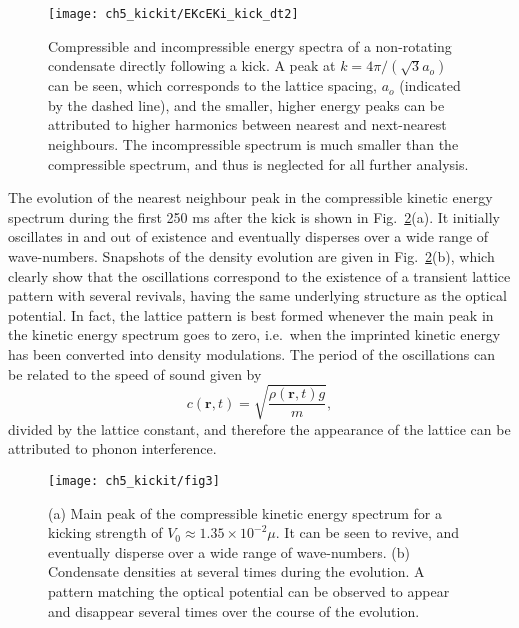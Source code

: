 \begin{figure}
    \centering
    \texttt{[image: ch5\_kickit/EKcEKi\_kick\_dt2]}
    \caption[Compressible and incompressible energy spectra of a non-rotating condensate directly following a kick.]{Compressible and incompressible energy spectra of a non-rotating condensate directly following a kick. A peak at $k=4\pi/(\sqrt{3}a_o)$ can be seen, which corresponds to the lattice spacing, $a_o$ (indicated by the dashed line), and the smaller, higher energy peaks can be attributed to higher harmonics between nearest and next-nearest neighbours. The incompressible spectrum is much smaller than the compressible spectrum, and thus is neglected for all further analysis.}
    \label{fig:ekc_eki_novtx}
\end{figure}


The evolution of the nearest neighbour peak in the compressible kinetic energy spectrum during the first 250 ms after the kick is shown in Fig.~\ref{fig:novtx_p5k}(a). It initially oscillates in and out of existence and eventually disperses over a wide range of wave-numbers. Snapshots of the density evolution are given in Fig.~\ref{fig:novtx_p5k}(b), which clearly show that the oscillations correspond to the existence of a transient lattice pattern with several revivals, having the same underlying structure as the optical potential. In fact, the lattice pattern is best formed whenever the main peak in the kinetic energy spectrum goes to zero, i.e.~when the imprinted kinetic energy has been converted into density modulations. The period of the oscillations can be related to the speed of sound given by
\begin{equation}
c(\textbf{r},t) = \sqrt{\frac{\rho (\textbf{r},t) g}{m}},
\end{equation}
divided by the lattice constant, and therefore the appearance of the lattice can be attributed to phonon interference.

\begin{figure}
    \centering

	\texttt{[image: ch5\_kickit/fig3]}
	\caption[Effect of kicking on non-rotating condensate.]{(a) Main peak of the compressible kinetic energy spectrum for a kicking strength of $V_0 \approx 1.35\times10^{-2}\mu$. It can be seen to revive, and eventually disperse over a wide range of wave-numbers.  (b) Condensate densities at several times during the evolution. A pattern matching the optical potential can be observed to appear and disappear several times over the course of the evolution.}
	\label{fig:novtx_p5k}
\end{figure}


